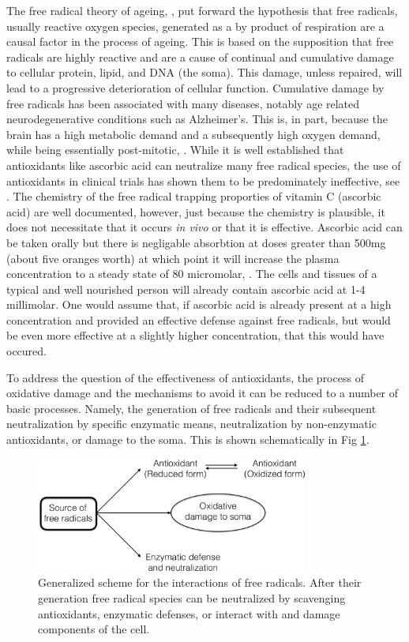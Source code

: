 \documentclass[preprint,12pt,authoryear]{elsarticle}
\begin{document}
The free radical theory of ageing, \citet{Harman:1956wu}, put forward the hypothesis that
free radicals, usually reactive oxygen species, generated as a by product of respiration are a causal
factor in the process of ageing. This is based on the supposition that free radicals are highly reactive
and are a cause of continual and cumulative damage to cellular protein, lipid, and
DNA (the soma). This damage, unless repaired, will lead to a progressive
deterioration of cellular function. Cumulative damage by free radicals has been associated
with many diseases, notably age related neurodegenerative conditions such as
Alzheimer's. This is, in part, because the brain has a high metabolic demand and a
subsequently high oxygen demand, while being essentially post-mitotic, \citet{Cobley:2018kt}.  
While it is well established that antioxidants like ascorbic acid can neutralize many free radical
species, the use of antioxidants in clinical trials has shown them to be predominately ineffective, see \citet{Steinhubl:2008el}. 
The chemistry of the free radical trapping proporties of vitamin C (ascorbic acid) are well documented, 
however, just because the chemistry is plausible, it does not necessitate that it occurs \emph{in vivo} or 
that it is effective. Ascorbic acid can be taken orally but there is negligable absorbtion at doses greater than 500mg (about five oranges worth) at which point it will increase the plasma concentration to a steady state of 80 micromolar, \citet{Padayatty:2003}. The cells and tissues of a typical and well nourished person will already contain ascorbic acid at 1-4 millimolar. 
One would assume that, if ascorbic acid is already present at a high concentration and provided an effective defense against free radicals, but would be even more effective at a slightly higher concentration, that this would have occured.

To address the question of the effectiveness of antioxidants, the process of oxidative damage and the mechanisms to avoid it can be reduced to a number of basic processes. Namely, the generation of free radicals and their subsequent neutralization by specific enzymatic means, neutralization by non-enzymatic antioxidants, or damage to the soma. This is shown schematically in Fig \ref{fig:g1}.




\begin{figure}
\begin{center}
\includegraphics[width=0.8\textwidth]{Figure1.eps}
\end{center}
\caption{\label{fig:g1} Generalized scheme for the interactions of free radicals. After their generation
free radical species can be neutralized by scavenging antioxidants, enzymatic defenses, or
interact with and damage components of the cell.}
\end{figure}
\end{document}
